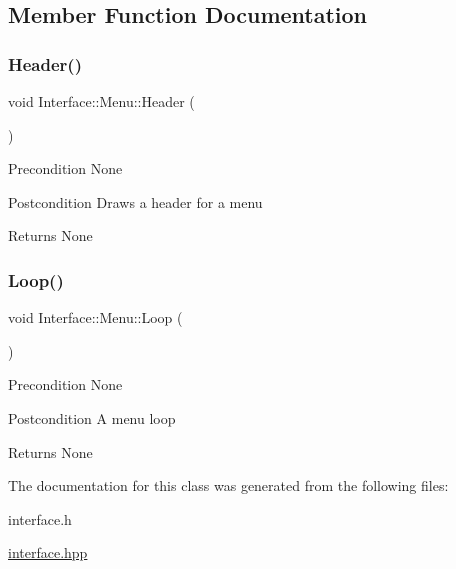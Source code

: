 \subsection{Member Function Documentation}
\mbox{\label{class_interface_1_1_menu_ac9c262f57118f3b3043bed327f195c00}} 
\subsubsection{\texorpdfstring{Header()}{Header()}}
{\footnotesize\ttfamily void Interface\+::\+Menu\+::\+Header (\begin{DoxyParamCaption}{ }\end{DoxyParamCaption})}

\begin{DoxyPrecond}{Precondition}
None 
\end{DoxyPrecond}
\begin{DoxyPostcond}{Postcondition}
Draws a header for a menu 
\end{DoxyPostcond}
\begin{DoxyReturn}{Returns}
None 
\end{DoxyReturn}
\mbox{\label{class_interface_1_1_menu_ac6e7791ff9ffb233d07e05653a4f5bb2}} 
\subsubsection{\texorpdfstring{Loop()}{Loop()}}
{\footnotesize\ttfamily void Interface\+::\+Menu\+::\+Loop (\begin{DoxyParamCaption}{ }\end{DoxyParamCaption})}

\begin{DoxyPrecond}{Precondition}
None 
\end{DoxyPrecond}
\begin{DoxyPostcond}{Postcondition}
A menu loop 
\end{DoxyPostcond}
\begin{DoxyReturn}{Returns}
None 
\end{DoxyReturn}


The documentation for this class was generated from the following files\+:\begin{DoxyCompactItemize}
\item 
interface.\+h\item 
\mbox{\hyperlink{interface_8hpp}{interface.\+hpp}}\end{DoxyCompactItemize}
